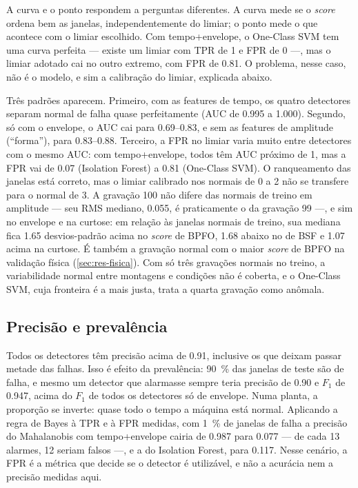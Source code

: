 A curva e o ponto respondem a perguntas diferentes. A curva mede se o
\emph{score} ordena bem as janelas, independentemente do limiar; o ponto mede o
que acontece com o limiar escolhido. Com tempo+envelope, o One-Class SVM tem uma
curva perfeita --- existe um limiar com TPR de 1 e FPR de 0 ---, mas o limiar
adotado cai no outro extremo, com FPR de \num{0.81}. O problema, nesse caso, não
é o modelo, e sim a calibração do limiar, explicada abaixo.

Três padrões aparecem. Primeiro, com as features de tempo, os quatro detectores
separam normal de falha quase perfeitamente (AUC de \num{0.995} a \num{1.000}).
Segundo, só com o envelope, o AUC cai para \numrange{0.69}{0.83}, e sem as
features de amplitude (``forma''), para \numrange{0.83}{0.88}. Terceiro, a FPR no
limiar varia muito entre detectores com o mesmo AUC: com tempo+envelope, todos
têm AUC próximo de 1, mas a FPR vai de \num{0.07} (Isolation Forest) a
\num{0.81} (One-Class SVM). O ranqueamento das janelas está correto, mas o limiar
calibrado nos normais de 0 a \SI{2}{\hp} não se transfere para o normal de
\SI{3}{\hp}. A gravação 100 não difere das normais de treino em amplitude --- seu
RMS mediano, \num{0.055}, é praticamente o da gravação 99 ---, e sim no envelope e
na curtose: em relação às janelas normais de treino, sua mediana fica
\num{1.65} desvios-padrão acima no \emph{score} de BPFO, \num{1.68} abaixo no de BSF e
\num{1.07} acima na curtose. É também a gravação normal com o maior \emph{score} de BPFO
na validação física (\autoref{sec:res-fisica}). Com só três gravações normais no
treino, a variabilidade normal entre montagens e condições não é coberta, e o
One-Class SVM, cuja fronteira é a mais justa, trata a quarta gravação como
anômala.

\subsection{Precisão e prevalência}
\label{sec:res-prevalencia}

Todos os detectores têm precisão acima de
\num{0.91}, inclusive os que deixam passar metade das falhas. Isso é efeito da
prevalência: \SI{90}{\percent} das janelas de teste são de falha, e mesmo um
detector que alarmasse sempre teria precisão de \num{0.90} e $F_1$ de
\num{0.947}, acima do $F_1$ de todos os detectores só de envelope. Numa planta, a
proporção se inverte: quase todo o tempo a máquina está normal. Aplicando a regra
de Bayes à TPR e à FPR medidas, com \SI{1}{\percent} de janelas de falha a
precisão do Mahalanobis com tempo+envelope cairia de \num{0.987} para
\num{0.077} --- de cada 13 alarmes, 12 seriam falsos ---, e a do Isolation Forest,
para \num{0.117}. Nesse cenário, a FPR é a métrica que decide se o detector é
utilizável, e não a acurácia nem a precisão medidas aqui.

